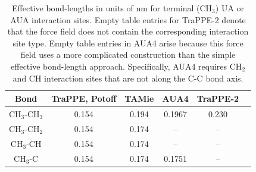 \documentclass[preprint,review,12pt]{elsarticle}
\begin{document}
\begin{table}[h!]
	\caption{Effective bond-lengths in units of nm for terminal (CH$_3$) UA or AUA interaction sites. Empty table entries for TraPPE-2 denote that the force field does not contain the corresponding interaction site type. Empty table entries in AUA4 arise because this force field uses a more complicated construction than the simple effective bond-length approach. Specifically, AUA4 requires CH$_2$ and CH interaction sites that are not along the C-C bond axis.} \label{tab:bond-lengths}
	\begin{center}
		\begin{tabular}{|c|c|c|c|c|c|}
			\hline
			Bond & TraPPE, Potoff & TAMie & AUA4 & TraPPE-2 \\ \hline
			CH$_3$-CH$_3$ & 0.154 & 0.194 & 0.1967 & 0.230 \\ 
			CH$_3$-CH$_2$ & 0.154 & 0.174 & -- & -- \\ 
			CH$_3$-CH & 0.154 & 0.174 & -- & -- \\
			CH$_3$-C & 0.154 & 0.174 & 0.1751 & -- \\
			\hline
		\end{tabular}
	\end{center} 
\end{table}
\end{document}
